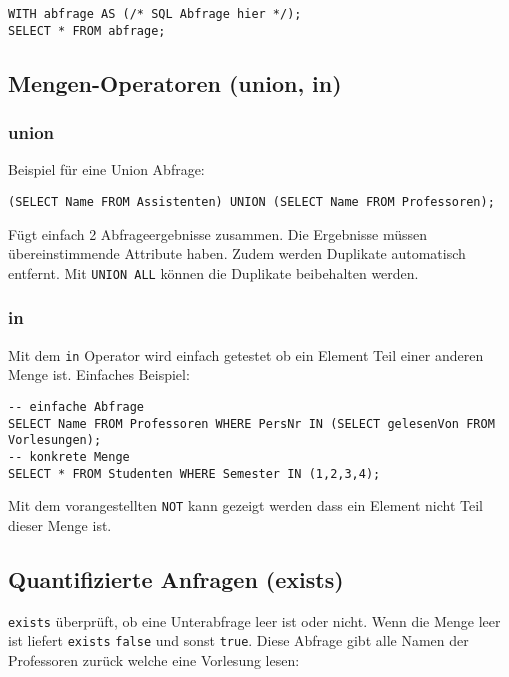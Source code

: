 \begin{lstlisting}[caption={with Operator},label=lst:with]
WITH abfrage AS (/* SQL Abfrage hier */);
SELECT * FROM abfrage;
\end{lstlisting}

\subsection{Mengen-Operatoren (union, in)}
\label{sec:mengen_operatoren}

\subsubsection{union}
Beispiel für eine Union Abfrage:

\begin{lstlisting}[caption={Union Abfrage Beispiel},label=lst:union_bsp]
(SELECT Name FROM Assistenten) UNION (SELECT Name FROM Professoren);
\end{lstlisting}

Fügt einfach 2 Abfrageergebnisse zusammen. Die Ergebnisse müssen übereinstimmende Attribute haben. Zudem werden Duplikate automatisch entfernt. Mit \texttt{UNION ALL} können die Duplikate beibehalten werden.

\subsubsection{in}
\label{sec:in_operator}

Mit dem \texttt{in} Operator wird einfach getestet ob ein Element Teil einer anderen Menge ist. Einfaches Beispiel:

\begin{lstlisting}[caption={Beispiel in Operator},label=lst:in_bsp]
-- einfache Abfrage
SELECT Name FROM Professoren WHERE PersNr IN (SELECT gelesenVon FROM Vorlesungen);
-- konkrete Menge
SELECT * FROM Studenten WHERE Semester IN (1,2,3,4);
\end{lstlisting}

Mit dem vorangestellten \texttt{NOT} kann gezeigt werden dass ein Element nicht Teil dieser Menge ist.

\subsection{Quantifizierte Anfragen (exists)}

\texttt{exists} überprüft, ob eine Unterabfrage leer ist oder nicht. Wenn die Menge leer ist liefert \texttt{exists} \texttt{false} und sonst \texttt{true}. Diese Abfrage gibt alle Namen der Professoren zurück welche eine Vorlesung lesen:

